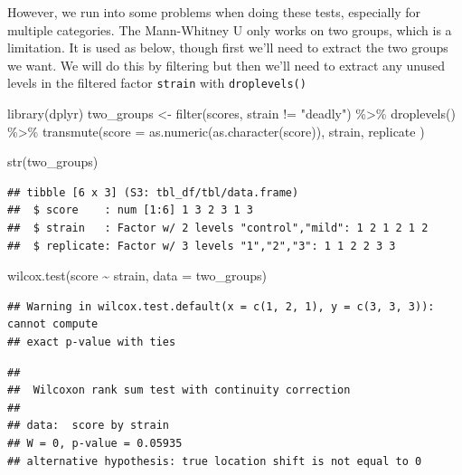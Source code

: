 \documentclass[
]{book}
\newenvironment{Shaded}{\begin{snugshade}}{\end{snugshade}}
\newcommand{\AttributeTok}[1]{\textcolor[rgb]{0.77,0.63,0.00}{#1}}
\newcommand{\FunctionTok}[1]{\textcolor[rgb]{0.00,0.00,0.00}{#1}}
\newcommand{\NormalTok}[1]{#1}
\newcommand{\OtherTok}[1]{\textcolor[rgb]{0.56,0.35,0.01}{#1}}
\newcommand{\SpecialCharTok}[1]{\textcolor[rgb]{0.00,0.00,0.00}{#1}}
\newcommand{\StringTok}[1]{\textcolor[rgb]{0.31,0.60,0.02}{#1}}
\begin{document}
However, we run into some problems when doing these tests, especially for multiple categories. The Mann-Whitney U only works on two groups, which is a limitation. It is used as below, though first we'll need to extract the two groups we want. We will do this by filtering but then we'll need to extract any unused levels in the filtered factor \texttt{strain} with \texttt{droplevels()}

\begin{Shaded}
\begin{Highlighting}[]
\FunctionTok{library}\NormalTok{(dplyr)}
\NormalTok{two\_groups }\OtherTok{\textless{}{-}} \FunctionTok{filter}\NormalTok{(scores, strain }\SpecialCharTok{!=} \StringTok{"deadly"}\NormalTok{) }\SpecialCharTok{\%\textgreater{}\%} 
  \FunctionTok{droplevels}\NormalTok{() }\SpecialCharTok{\%\textgreater{}\%} 
  \FunctionTok{transmute}\NormalTok{(}\AttributeTok{score =} \FunctionTok{as.numeric}\NormalTok{(}\FunctionTok{as.character}\NormalTok{(score)),}
\NormalTok{            strain, replicate}
\NormalTok{            )}

\FunctionTok{str}\NormalTok{(two\_groups)}
\end{Highlighting}
\end{Shaded}

\begin{verbatim}
## tibble [6 x 3] (S3: tbl_df/tbl/data.frame)
##  $ score    : num [1:6] 1 3 2 3 1 3
##  $ strain   : Factor w/ 2 levels "control","mild": 1 2 1 2 1 2
##  $ replicate: Factor w/ 3 levels "1","2","3": 1 1 2 2 3 3
\end{verbatim}

\begin{Shaded}
\begin{Highlighting}[]
\FunctionTok{wilcox.test}\NormalTok{(score }\SpecialCharTok{\textasciitilde{}}\NormalTok{ strain, }\AttributeTok{data =}\NormalTok{ two\_groups)}
\end{Highlighting}
\end{Shaded}

\begin{verbatim}
## Warning in wilcox.test.default(x = c(1, 2, 1), y = c(3, 3, 3)): cannot compute
## exact p-value with ties
\end{verbatim}

\begin{verbatim}
## 
## 	Wilcoxon rank sum test with continuity correction
## 
## data:  score by strain
## W = 0, p-value = 0.05935
## alternative hypothesis: true location shift is not equal to 0
\end{verbatim}
\end{document}
